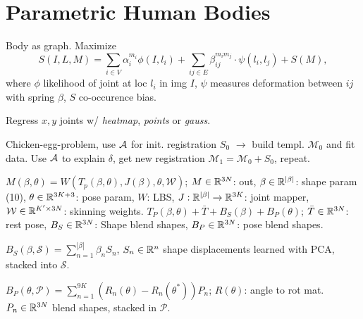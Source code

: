 \section{Parametric Human Bodies}
\begin{definition}
    Body as graph. Maximize
    \[S(I, L, M) = \sum_{i \in V} \alpha_i^{m_i} \phi(I, l_i) + \sum_{ij \in E} \beta_{ij}^{m_im_j} \cdot \psi(l_i, l_j) + S(M),\]
    where \(\phi\) likelihood of joint at loc \(l_i\) in img \(I\), \(\psi\) measures deformation between \(ij\) with spring \(\beta\), \(S\) co-occurence bias.
\end{definition}

\begin{definition}
    Regress \(x, y\) joints w/ \textit{heatmap}, \textit{points} or \textit{gauss}.
\end{definition}

\begin{definition}
    Chicken-egg-problem, use \(\mathcal{A}\) for init. registration \(S_0\) \(\to\) build templ. \(\mathcal{M}_0\) and fit data. Use \(\mathcal{A}\) to explain \(\delta\), get new registration \(\mathcal{M}_1 = \mathcal{M}_0 + S_0\), repeat.
\end{definition}

\begin{definition}[SMPL]
    \(M(\beta, \theta) = W(T_p(\beta, \theta), J(\beta), \theta, \mathcal{W})\); \(M \in \mathbb{R}^{3N}\): out, \(\beta \in \mathbb{R}^{|\beta|}\): shape param (10), \(\theta \in \mathbb{R}^{3K + 3}\): pose param, \(W\): LBS, \(J: \mathbb{R}^{|\beta|} \to \mathbb{R}^{3K}\): joint mapper, \(\mathcal W \in \mathbb{R}^{K' \times 3N}\): skinning weights.
    \(T_P(\beta, \theta) + \bar T + B_S(\beta) + B_P(\theta)\); \(\bar T \in \mathbb{R}^{3N}\): rest pose, \(B_S \in \mathbb{R}^{3N}\): Shape blend shapes, \(B_P \in \mathbb{R}^{3N}\): pose blend shapes.
\end{definition}

\begin{definition}
    \(B_S(\beta, \mathcal S) = \sum_{n=1}^{|\beta|} \beta_n S_n\), \(S_n \in \mathbb{R}^n\) shape displacements learned with PCA, stacked into \(\mathcal S\).
\end{definition}

\begin{definition}
    \(B_P(\theta, \mathcal P) = \sum_{n=1}^{9K}(R_n(\theta) - R_n(\theta^*))P_n\); \(R(\theta)\): angle to rot mat. \(P_n \in \mathbb{R}^{3N}\) blend shapes, stacked in \(\mathcal P\). 
\end{definition}

